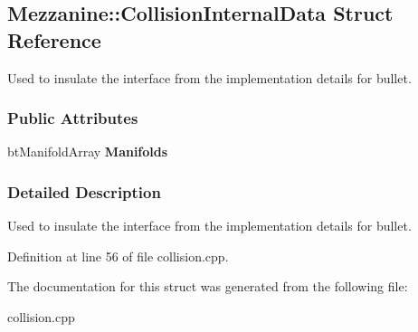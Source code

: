 \hypertarget{structMezzanine_1_1CollisionInternalData}{
\subsection{Mezzanine::CollisionInternalData Struct Reference}
\label{structMezzanine_1_1CollisionInternalData}
}


Used to insulate the interface from the implementation details for bullet.  


\subsubsection*{Public Attributes}
\begin{DoxyCompactItemize}
\item 
\hypertarget{structMezzanine_1_1CollisionInternalData_a9f62c525b0438ef18a6475d78474c340}{
btManifoldArray {\bfseries Manifolds}}
\label{structMezzanine_1_1CollisionInternalData_a9f62c525b0438ef18a6475d78474c340}

\end{DoxyCompactItemize}


\subsubsection{Detailed Description}
Used to insulate the interface from the implementation details for bullet. 

Definition at line 56 of file collision.cpp.



The documentation for this struct was generated from the following file:\begin{DoxyCompactItemize}
\item 
collision.cpp\end{DoxyCompactItemize}
